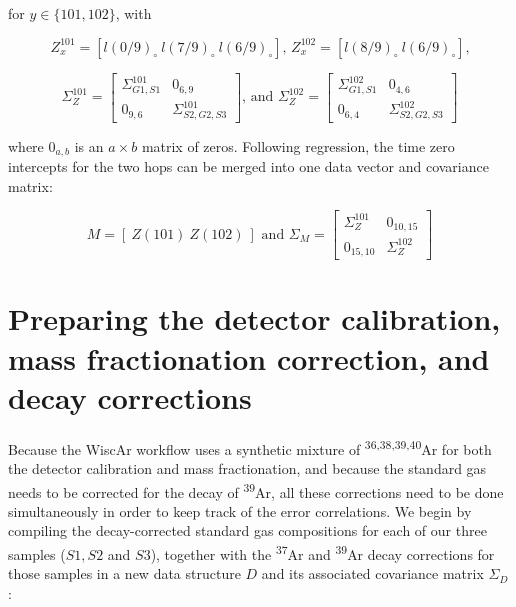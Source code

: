 \documentclass{article}
\begin{document}
\noindent for $y \in \{101, 102\}$, with

\begin{equation}
  Z^{101}_{x} = \left[ l(0/9)_\circ ~ l(7/9)_\circ ~ l(6/9)_\circ \right]
  \mbox{,~}
  Z^{102}_{x} = \left[ l(8/9)_\circ ~ l(6/9)_\circ \right]
  \mbox{,}
\end{equation}

\begin{equation}
  \Sigma_{Z}^{101} = \left[
    \begin{array}{cc}
      \Sigma^{101}_{G1,S1} & 0_{6,9} \\
      0_{9,6} & \Sigma^{101}_{S2,G2,S3}
    \end{array}
    \right]
  \mbox{,~and~}
  \Sigma_{Z}^{102} = \left[
    \begin{array}{cc}
      \Sigma^{102}_{G1,S1} & 0_{4,6} \\
      0_{6,4} & \Sigma^{102}_{S2,G2,S3}
    \end{array}
    \right]
\end{equation}

\noindent where $0_{a,b}$ is an $a \times b$ matrix of
zeros. Following regression, the time zero intercepts for the two hops
can be merged into one data vector and covariance matrix:

\begin{equation}
  M = \left[ ~ Z(101) ~ Z(102) ~ \right]
  \mbox{~and~}
  \Sigma_{M} = \left[
    \begin{array}{cc}
      \Sigma^{101}_Z & 0_{10,15} \\
      0_{15,10} & \Sigma^{102}_Z
    \end{array}
    \right]
\end{equation}

\section{Preparing the detector calibration,
  mass fractionation correction, and decay corrections}
\label{sec:preparingthecorrections}

Because the WiscAr workflow uses a synthetic mixture of
\textsuperscript{36,38,39,40}Ar for both the detector calibration and
mass fractionation, and because the standard gas needs to be corrected
for the decay of \textsuperscript{39}Ar, all these corrections need to
be done simultaneously in order to keep track of the error
correlations. We begin by compiling the decay-corrected standard gas
compositions for each of our three samples ($S1, S2$ and $S3$),
together with the \textsuperscript{37}Ar and \textsuperscript{39}Ar
decay corrections for those samples in a new data structure $D$ and
its associated covariance matrix $\Sigma_D$:
\end{document}
